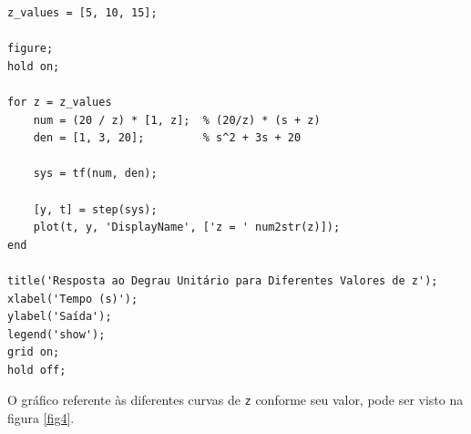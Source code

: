 \documentclass[a4paper,12pt]{article}
\begin{document}
\begin{enumerate}
\begin{lstlisting}
z_values = [5, 10, 15];

figure;
hold on;

for z = z_values
    num = (20 / z) * [1, z];  % (20/z) * (s + z)
    den = [1, 3, 20];         % s^2 + 3s + 20

    sys = tf(num, den);

    [y, t] = step(sys);
    plot(t, y, 'DisplayName', ['z = ' num2str(z)]);
end

title('Resposta ao Degrau Unitário para Diferentes Valores de z');
xlabel('Tempo (s)');
ylabel('Saída');
legend('show');
grid on;
hold off;
        \end{lstlisting}
        O gráfico referente às diferentes curvas de \texttt{z} conforme seu valor, pode ser visto na figura \ref{fig4}.
    \end{enumerate}
\end{document}
